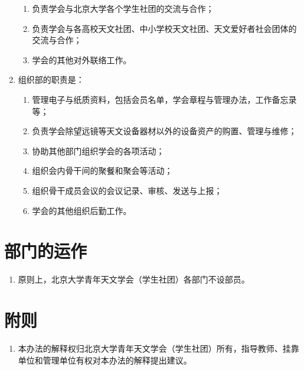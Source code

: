 \begin{enumerate}[resume]
    \begin{enumerate}
        \item 负责学会与北京大学各个学生社团的交流与合作；
        \item 负责学会与各高校天文社团、中小学校天文社团、天文爱好者社会团体的交流与合作；
        \item 学会的其他对外联络工作。
    \end{enumerate}
    
    \item 组织部的职责是：
    
    \begin{enumerate}
        \item 管理电子与纸质资料，包括会员名单，学会章程与管理办法，工作备忘录等；
        \item 负责学会除望远镜等天文设备器材以外的设备资产的购置、管理与维修；
        \item 协助其他部门组织学会的各项活动；
        \item 组织会内骨干间的聚餐和聚会等活动；
        \item 组织骨干成员会议的会议记录、审核、发送与上报；
        \item 学会的其他组织后勤工作。
    \end{enumerate}

\end{enumerate}

\section{部门的运作}

\begin{enumerate}[resume]
    \item 原则上，北京大学青年天文学会（学生社团）各部门不设部员。
\end{enumerate}

\section{附则}

\begin{enumerate}[resume]
    \item 本办法的解释权归北京大学青年天文学会（学生社团）所有，指导教师、挂靠单位和管理单位有权对本办法的解释提出建议。
\end{enumerate}
